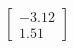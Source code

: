 \documentclass[preview]{standalone}
\begin{document}
\begin{align*}
\begin{bmatrix} -3.12 \\ 1.51 \end{bmatrix}
\end{align*}
\end{document}
